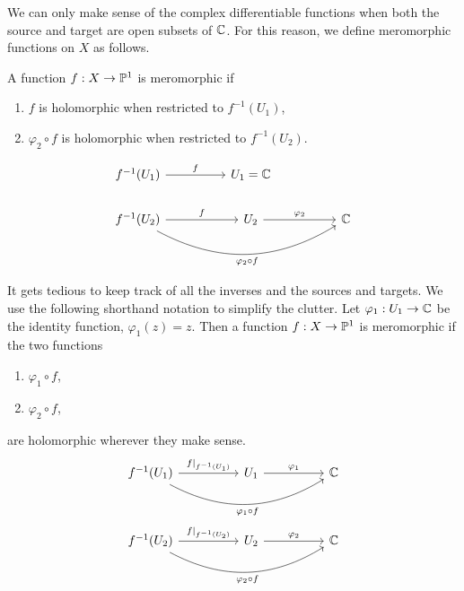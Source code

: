\documentclass{article}
\begin{document}
    We can only make sense of the complex differentiable functions when both the source and target are open subsets of $\mathbb{C}$. For this reason, we define meromorphic functions on $X$ as follows.

    A function $f: X \rightarrow \mathbb{P}^1$ is meromorphic if
    \begin{enumerate}
      \item $f$ is holomorphic when restricted to $f^{-1}(U_1)$,
      \item $\varphi_2 \circ f$ is holomorphic when restricted to ${f^{-1}(U_2)}$.
    \end{enumerate}
    \begin{equation*}
      \begin{tikzcd}
        f^{-1}(U_1) \ar[rr,"f"] & &  U_1 = \bbc\\
        f^{-1}(U_2) \ar[rr, "f"] \ar[rrrr, "\varphi_2 \circ f", swap, bend right] & & U_2 \ar[rr, "\varphi_2"] & & \bbc
      \end{tikzcd}
    \end{equation*}

    It gets tedious to keep track of all the inverses and the sources and targets.
    We use the following shorthand notation to simplify the clutter.
    Let $\varphi_1: U_1 \rightarrow \mathbb{C}$ be the identity function, $\varphi_1(z) = z$.
    Then a function $f: X \rightarrow \mathbb{P}^1$ is meromorphic if the two functions
    \begin{enumerate}
      \item $\varphi_1 \circ f$,
      \item $\varphi_2 \circ f$,
    \end{enumerate}
    are holomorphic wherever they make sense.
    \begin{equation*}
      \begin{tikzcd}
        f^{-1}(U_1) \ar[rrrr, "\varphi_1 \circ f", swap, bend right] \ar[rr,"f|_{f^{-1}(U_1)}"] &  &  U_1 \ar[rr, "\varphi_1"] & & \bbc\\\\
        f^{-1}(U_2) \ar[rr, "f|_{f^{-1}(U_2)}"] \ar[rrrr, "\varphi_2 \circ f", swap, bend right] &  & U_2 \ar[rr, "\varphi_2"] & & \bbc
      \end{tikzcd}
    \end{equation*}
\end{document}
